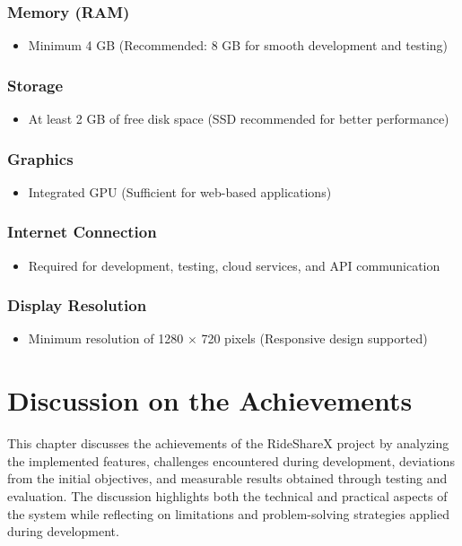 \documentclass[12pt,a4paper]{report}
\begin{document}
\subsection*{Memory (RAM)}
\begin{itemize}
	\item Minimum 4 GB (Recommended: 8 GB for smooth development and testing)
\end{itemize}

\subsection*{Storage}
\begin{itemize}
	\item At least 2 GB of free disk space (SSD recommended for better performance)
\end{itemize}

\subsection*{Graphics}
\begin{itemize}
	\item Integrated GPU (Sufficient for web-based applications)
\end{itemize}

\subsection*{Internet Connection}
\begin{itemize}
	\item Required for development, testing, cloud services, and API communication
\end{itemize}

\subsection*{Display Resolution}
\begin{itemize}
	\item Minimum resolution of 1280 $\times$ 720 pixels (Responsive design supported)
\end{itemize}

\chapter{Discussion on the Achievements}

This chapter discusses the achievements of the RideShareX project by analyzing the implemented features, challenges encountered during development, deviations from the initial objectives, and measurable results obtained through testing and evaluation. The discussion highlights both the technical and practical aspects of the system while reflecting on limitations and problem-solving strategies applied during development.
\end{document}
